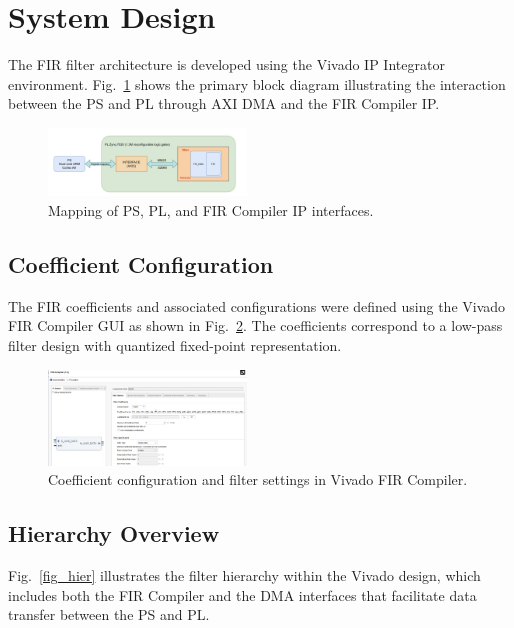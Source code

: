 \documentclass[conference]{IEEEtran}
\begin{document}
	\section{System Design}
	The FIR filter architecture is developed using the Vivado IP Integrator environment. Fig.~\ref{fig_block} shows the primary block diagram illustrating the interaction between the PS and PL through AXI DMA and the FIR Compiler IP.
	
	\begin{figure}[htbp]
		\centerline{\includegraphics[width=0.47\textwidth]{blockdiagram.png}}
		\caption{Mapping of PS, PL, and FIR Compiler IP interfaces.}
		\label{fig_block}
	\end{figure}
	
	\subsection{Coefficient Configuration}
	The FIR coefficients and associated configurations were defined using the Vivado FIR Compiler GUI as shown in Fig.~\ref{fig_coeff}. The coefficients correspond to a low-pass filter design with quantized fixed-point representation.
	
	\begin{figure}[htbp]
		\centerline{\includegraphics[width=0.47\textwidth]{Coeff_config.png}}
		\caption{Coefficient configuration and filter settings in Vivado FIR Compiler.}
		\label{fig_coeff}
	\end{figure}
	
	\subsection{Hierarchy Overview}
	Fig.~\ref{fig_hier} illustrates the filter hierarchy within the Vivado design, which includes both the FIR Compiler and the DMA interfaces that facilitate data transfer between the PS and PL.
	
\end{document}
